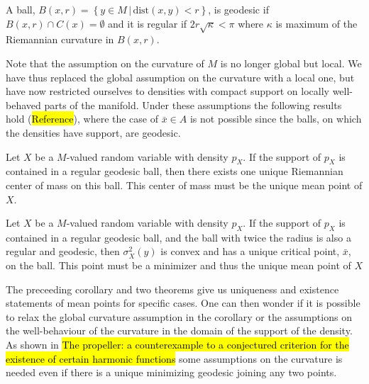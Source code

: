 \begin{definition}
A ball, $B(x,r) = \left\{ y \in M \, | \, \text{dist}(x,y) < r  \right\}$, is geodesic if $B(x,r) \cap C(x) = \emptyset$ and it is regular if $2r \sqrt{\kappa} < \pi$ where $\kappa$ is maximum of the Riemannian curvature in $B(x,r)$.
\end{definition}

Note that the assumption on the curvature of $M$ is no longer global but local. We have thus replaced the global assumption on the curvature with a local one, but have now restricted ourselves to densities with compact support on locally well-behaved parts of the manifold. Under these assumptions the following results hold (\hl{Reference}), where the case of $\bar{x} \in A$ is not possible since the balls, on which the densities have support, are geodesic. 

\begin{theorem}
Let $X$ be a $M$-valued random variable with density $p_X$. If the support of $p_X$ is contained in a regular geodesic ball, then there exists one unique Riemannian center of mass on this ball. This center of mass must be the unique mean point of $X$.
\end{theorem}

\begin{theorem}
Let $X$ be a $M$-valued random variable with density $p_X$. If the support of $p_X$ is contained in a regular geodesic ball, and the ball with twice the radius is also a regular and geodesic, then $\sigma^2_X(y)$ is convex and has a unique critical point, $\bar{x}$, on the ball. This point must be a minimizer and thus the unique mean point of $X$
\end{theorem}

The preceeding corollary and two theorems give us uniqueness and existence statements of mean points for specific cases. One can then wonder if it is possible to relax the global curvature assumption in the corollary or the assumptions on the well-behaviour of the curvature in the domain of the support of the density. As shown in \hl{The propeller: a counterexample to a conjectured criterion for the existence of certain harmonic functions} some assumptions on the curvature is needed even if there is a unique minimizing geodesic joining any two points.



